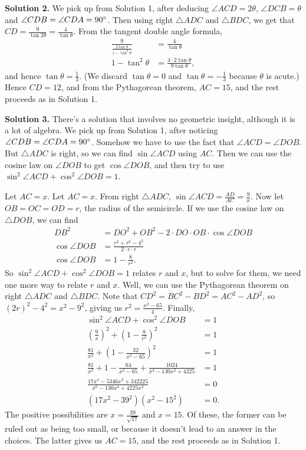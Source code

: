 \documentclass[11pt,paper=letter]{scrartcl}
\newcommand{\soln}[1]{{\sffamily \bfseries Solution #1.}\;}
\begin{document}
\begin{enumerate}[align=left,leftmargin=*]
\soln2 We pick up from Solution 1, after deducing $\angle ACD = 2\theta$, $\angle DCB = \theta$ and $\angle CDB = \angle CDA = 90^\circ$. Then using right $\triangle ADC$ and $\triangle BDC$, we get that $CD = \frac{9}{\tan 2\theta} = \frac{4}{\tan \theta}$. From the tangent double angle formula,
\begin{align*}
\frac{9}{\frac{2\tan \theta}{1 - \tan^2\theta}}
&= \frac{4}{\tan\theta} \\
1 - \tan^2 \theta &= \frac{4 \cdot 2 \tan \theta}{9 \tan \theta},
\end{align*}
and hence $\tan \theta = \frac{1}{3}$. (We discard $\tan \theta = 0$ and $\tan \theta = -\frac{1}{3}$ because $\theta$ is acute.) Hence $CD = 12$, and from the Pythagorean theorem, $AC = 15$, and the rest proceeds as in Solution 1.

\soln3 There's a solution that involves no geometric insight, although it is a lot of algebra. We pick up from Solution 1, after noticing $\angle CDB = \angle CDA = 90^\circ$. Somehow we have to use the fact that $\angle ACD = \angle DOB$. But $\triangle ADC$ is right, so we can find $\sin \angle ACD$ using $AC$. Then we can use the cosine law on $\angle DOB$ to get $\cos \angle DOB$, and then try to use $\sin^2 \angle ACD + \cos^2 \angle DOB = 1$.

Let $AC = x$. Let $AC = x$. From right $\triangle ADC$, $\sin \angle ACD = \frac{AD}{AC} = \frac{9}{x}$. Now let $OB = OC = OD = r$, the radius of the semicircle. If we use the cosine law on $\triangle DOB$, we can find
\begin{align*}
DB^2 &= DO^2 + OB^2 - 2 \cdot DO \cdot OB \cdot \cos \angle DOB \\
\cos \angle DOB &= \frac{r^2 + r^2 - 4^2}{2 \cdot r \cdot r} \\
\cos \angle DOB &= 1 - \frac{8}{r^2}.
\end{align*}
So $\sin^2 \angle ACD + \cos^2 \angle DOB = 1$ relates $r$ and $x$, but to solve for them, we need one more way to relate $r$ and $x$. Well, we can use the Pythagorean theorem on right $\triangle ADC$ and $\triangle BDC$. Note that $CD^2 = BC^2 - BD^2 = AC^2 - AD^2$, so $(2r)^2 - 4^2 = x^2 - 9^2$, giving us $r^2 = \frac{x^2 - 65}{4}$. Finally,
\begin{align*}
\sin^2 \angle ACD + \cos^2 \angle DOB &= 1 \\
\left(\frac{9}{x}\right)^2
+ \left(1 - \frac{8}{r^2}\right)^2
&= 1 \\
\frac{81}{x^2}
+ \left(1 - \frac{32}{x^2 - 65}\right)^2 &= 1 \\
\frac{81}{x^2} +
1 - \frac{64}{x^2 - 65} + \frac{1024}{x^4 - 130x^2 + 4225}
&= 1 \\
\frac{17x^4 - 5346x^2 + 342225}{x^6 - 130x^4 + 4225x^2} &= 0 \\
\left(17x^2 - 39^2\right)\left(x^2 - 15^2\right) &= 0.
\end{align*}
The positive possibilities are $x = \frac{39}{\sqrt{17}}$ and $x = 15$. Of these, the former can be ruled out as being too small, or because it doesn't lead to an answer in the choices. The latter gives us $AC = 15$, and the rest proceeds as in Solution 1.


\end{enumerate}
\end{document}
